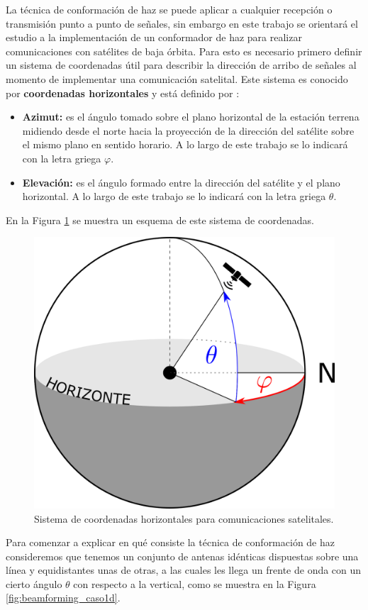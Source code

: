 La técnica de conformación de haz se puede aplicar a cualquier recepción o transmisión punto a punto de señales, sin embargo en este trabajo se orientará el estudio a la implementación de un conformador de haz para realizar comunicaciones con satélites de baja órbita. Para esto es necesario primero definir un sistema de coordenadas útil para describir la dirección de arribo de señales al momento de implementar una comunicación satelital. Este sistema es conocido por \textbf{coordenadas horizontales} y está definido por \cite{bib:MaralBousquet_p32}:

\begin{itemize}
    \item \textbf{Azimut:} es el ángulo tomado sobre el plano horizontal de la estación terrena midiendo desde el norte hacia la proyección de la dirección del satélite sobre el mismo plano en sentido horario. A lo largo de este trabajo se lo indicará con la letra griega $\varphi$.
    \item \textbf{Elevación:} es el ángulo formado entre la dirección del satélite y el plano horizontal. A lo largo de este trabajo se lo indicará con la letra griega $\theta$.
\end{itemize}

En la Figura \ref{fig:beamforming_lookangles} se muestra un esquema de este sistema de coordenadas.

\begin{figure}[ht]
    \centering
    \includegraphics[width=0.7\linewidth]{images/02-Beamforming/lookangles.png}
    \caption{Sistema de coordenadas horizontales para comunicaciones satelitales.}
    \label{fig:beamforming_lookangles}
\end{figure}

Para comenzar a explicar en qué consiste la técnica de conformación de haz consideremos que tenemos un conjunto de antenas idénticas dispuestas sobre una línea y equidistantes unas de otras, a las cuales les llega un frente de onda con un cierto ángulo $\theta$ con respecto a la vertical, como se muestra en la Figura \ref{fig:beamforming_caso1d}.

